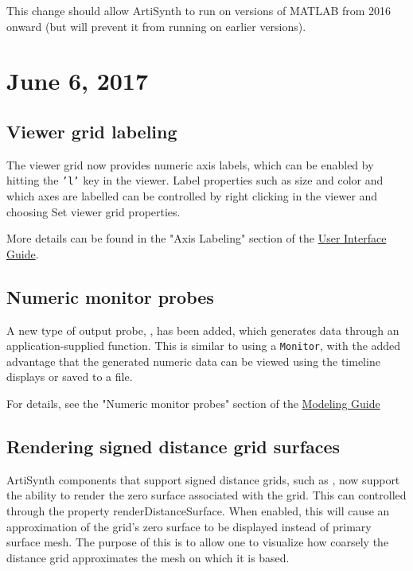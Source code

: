 \documentclass{article}
\begin{document}
\begin{sideblock}
This change should allow ArtiSynth to run on versions of MATLAB from
2016 onward (but will prevent it from running on earlier versions).
\end{sideblock}

\section*{June 6, 2017}

\subsection*{Viewer grid labeling}

The viewer grid now provides numeric axis labels, which can be enabled
by hitting the {\tt 'l'} key in the viewer. Label properties such as
size and color and which axes are labelled can be controlled by right
clicking in the viewer and choosing {\sf Set viewer grid properties}.

More details can be found in the "Axis Labeling" section
of the 
\href{http://www.artisynth.org/doc/html/uiguide/uiguide.html}
{User Interface Guide}.

\subsection*{Numeric monitor probes}

A new type of output probe,
, has been
added, which generates data through an application-supplied function.
This is similar to using a {\tt Monitor}, with the added advantage
that the generated numeric data can be viewed using the timeline
displays or saved to a file.

For details, see the "Numeric monitor probes"
section of the 
\href{http://www.artisynth.org/doc/html/modelguide/modelguide.html}
{Modeling Guide}

\subsection*{Rendering signed distance grid surfaces}

ArtiSynth components that support signed distance grids, such as
, now support the
ability to render the zero surface associated with the grid. This can
controlled through the property {\sf renderDistanceSurface}.  When
enabled, this will cause an approximation of the grid's zero surface
to be displayed instead of primary surface mesh. The purpose of this
is to allow one to visualize how coarsely the distance grid
approximates the mesh on which it is based.
\end{document}
